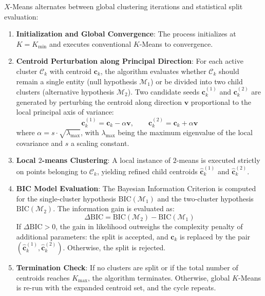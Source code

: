 $X$-Means alternates between global clustering iterations and statistical split evaluation:
\begin{enumerate}
    \item \textbf{Initialization and Global Convergence}: The process initializes at $K = K_{\min}$ and executes conventional $K$-Means to convergence.
    \item \textbf{Centroid Perturbation along Principal Direction}: For each active cluster $\mathcal{C}_k$ with centroid $\mathbf{c}_k$, the algorithm evaluates whether $\mathcal{C}_k$ should remain a single entity (null hypothesis $\mathcal{M}_1$) or be divided into two child clusters (alternative hypothesis $\mathcal{M}_2$). Two candidate seeds $\mathbf{c}_k^{(1)}$ and $\mathbf{c}_k^{(2)}$ are generated by perturbing the centroid along direction $\mathbf{v}$ proportional to the local principal axis of variance:
    \begin{equation}
    \label{eq:dm-xmeans-perturbation}
    \mathbf{c}_k^{(1)} = \mathbf{c}_k - \alpha \mathbf{v}, \qquad \mathbf{c}_k^{(2)} = \mathbf{c}_k + \alpha \mathbf{v}
    \end{equation}
    where $\alpha = s \cdot \sqrt{\lambda_{\max}}$, with $\lambda_{\max}$ being the maximum eigenvalue of the local covariance and $s$ a scaling constant.
    \item \textbf{Local $2$-means Clustering}: A local instance of $2$-means is executed strictly on points belonging to $\mathcal{C}_k$, yielding refined child centroids $\hat{\mathbf{c}}_k^{(1)}$ and $\hat{\mathbf{c}}_k^{(2)}$.
    \item \textbf{BIC Model Evaluation}: The Bayesian Information Criterion is computed for the single-cluster hypothesis $\mathrm{BIC}(\mathcal{M}_1)$ and the two-cluster hypothesis $\mathrm{BIC}(\mathcal{M}_2)$. The information gain is evaluated as:
    \begin{equation}
    \label{eq:dm-delta-bic}
    \Delta\mathrm{BIC} = \mathrm{BIC}(\mathcal{M}_2) - \mathrm{BIC}(\mathcal{M}_1)
    \end{equation}
    If $\Delta\mathrm{BIC} > 0$, the gain in likelihood outweighs the complexity penalty of additional parameters: the split is accepted, and $\mathbf{c}_k$ is replaced by the pair $(\hat{\mathbf{c}}_k^{(1)}, \hat{\mathbf{c}}_k^{(2)})$. Otherwise, the split is rejected.
    \item \textbf{Termination Check}: If no clusters are split or if the total number of centroids reaches $K_{\max}$, the algorithm terminates. Otherwise, global $K$-Means is re-run with the expanded centroid set, and the cycle repeats.
\end{enumerate}

